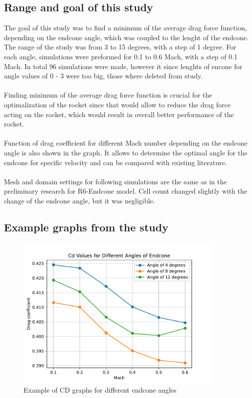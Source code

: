 \documentclass{article}
\begin{document}
\subsection{Range and goal of this study}
The goal of this study was to find a minimum of the average drag force function, depending on
the endcone angle, which was coupled to the lenght of the endcone. The range of the
study was from 3 to 15 degrees, with a step of 1 degree. For each angle, simulations were preformed for 
0.1 to 0.6 Mach, with a step of 0.1 Mach. In total 96 simulations were made, however it since 
lenghts of encone for angle values of 0 - 3 were too big, those where deleted from study.\\\\
Finding minimum of the average drag force function is crucial for the optimalization of the rocket
since that would allow to reduce the drag force acting on the rocket, which would result in
overall better performance of the rocket.\\\\
Function of drag coefficient for different Mach number depending on the endcone angle is also 
shown in the graph. It allows to determine the optimal angle for the endcone for specific
velocity and can be compared with existing literature.\\\\
Mesh and domain settings for following simulations are the same as in the preliminary research for
R6-Endcone model. Cell count changed slightly with the change of the endcone angle, but it was
negligible.

\subsection{Example graphs from the study}

\begin{figure}[H]
    \centering
    \includegraphics[width=0.9\textwidth]{../data/R6-Parametric-Endcone/ExampleCdGraphs.pdf}
    \caption{Example of CD graphs for different endcone angles}
\end{figure}
\end{document}
